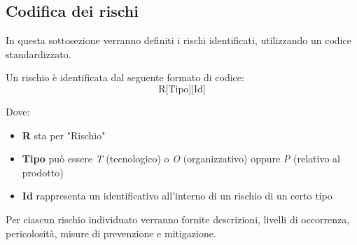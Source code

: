 \subsection{Codifica dei rischi}
In questa sottosezione verranno definiti i rischi identificati, utilizzando un codice standardizzato.

Un rischio è identificata dal seguente formato di codice:
\[
\text{R[Tipo][Id]}
\]

Dove:
\begin{itemize}
    \item \textbf{R} sta per "Rischio"
    \item \textbf{Tipo} può essere \emph{T} (tecnologico) o \emph{O} (organizzativo) oppure \emph{P} (relativo al prodotto)
    \item \textbf{Id} rappresenta un identificativo all'interno di un rischio di un certo tipo
\end{itemize}

Per ciascun rischio individuato verranno fornite descrizioni, livelli di occorrenza, pericolosità, misure di prevenzione e mitigazione.